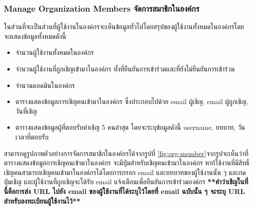 \subsubsection{\ifenglish Manage Organization Members \else จัดการสมาชิกในองค์กร \fi} \label{manage organization members}
\ifenglish \else 
ในส่วนที่จะเป็นส่วนที่ผู้ใช้งานในองค์กรจะเห็นข้อมูลทั่วไปโดยสรุปของผู้ใช้งานทั้งหมดในองค์กรโดยจะแสดงข้อมูลทั้งหมดดังนี้
\begin{itemize}
    \item จำนวนผู้ใช้งานทั้งหมดในองค์กร
    \item จำนวนผู้ใช้งานที่ถูกเชิญเข้ามาในองค์กร ทั้งที่ยืนยันการเข้าร่วมและที่ยังไม่ยืนยันการเข้าร่วม
    \item จำนวนแอดมินในองค์กร
    \item ตารางแสดงข้อมูลการเชิญคนเข้ามาในองค์กร ซึ่งประกอบไปด้วย email ผู้เชิญ, email ผู้ถูกเชิญ, วันที่เชิญ
    \item ตารางแสดงข้อมูลผู้ที่ตอบรับคำเชิญ 5 คนล่าสุด โดยจะระบุข้อมูลดังนี้ username, บทบาท, วันเวลาที่ตอบรับ
\end{itemize}
สามารถดูรูปภาพตัวอย่างการจัดการสมาชิกในองค์กรได้จากรูปที่ \ref{fig:org-member}จากรูปจะเห็นว่าที่ตารางแสดงข้อมูลการเชิญคนเข้ามาในองค์กร จะมีปุ่มสำหรับเชิญคนเข้ามาในองค์กร หาก้ใช้งานที่มีสิทธิ์เชิญคนสามารถเชิญคนเข้ามาในองค์กรได้โดยการกรอก email และบทบาทของผู้ใช้งานนั้น ๆ และกดปุ่มเชิญ และผู้ใช้งานที่ถูกเชิญจะได้รับ email แจ้งเตือนเพื่อยืนยันการเข้าร่วมองค์กร \textbf{**คำว่าเชิญในที่นี้คือการส่ง URL ไปยัง email ของผู้ใช้งานที่ได้ระบุไว้โดยที่ email ฉบับนั้น ๆ จะระบุ URL สำหรับลงทะเบียนผู้ใช้งานไว้**}
\fi



